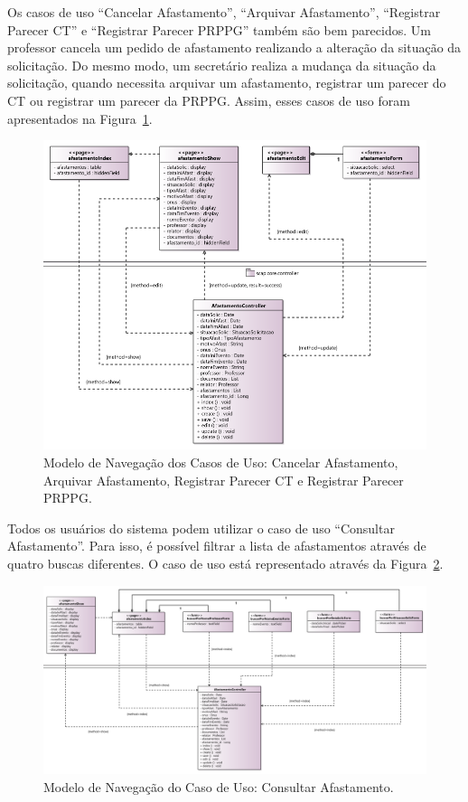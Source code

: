 Os casos de uso ``Cancelar Afastamento'', ``Arquivar Afastamento'', ``Registrar Parecer CT'' e ``Registrar Parecer PRPPG'' também são bem parecidos. Um professor cancela um pedido de afastamento realizando a alteração da situação da solicitação. Do mesmo modo, um secretário realiza a mudança da situação da solicitação, quando necessita arquivar um afastamento, registrar um parecer do CT ou registrar um parecer da PRPPG. Assim, esses casos de uso foram apresentados na Figura~\ref{figura-arquitetura-cancelar_arquivar_CT_PRPPG}.   

\begin{figure}[h]
	\centering
	\includegraphics[width=1\textwidth]{figuras/figura-arquitetura-cancelar_arquivar_CT_PRPPG.png}
	\caption{Modelo de Navegação dos Casos de Uso: Cancelar Afastamento, Arquivar Afastamento, Registrar Parecer CT e Registrar Parecer PRPPG.}
	\label{figura-arquitetura-cancelar_arquivar_CT_PRPPG}
\end{figure}

Todos os usuários do sistema podem utilizar o caso de uso ``Consultar Afastamento''. Para isso, é possível filtrar a lista de afastamentos através de quatro buscas diferentes. O caso de uso está representado através da Figura~\ref{figura-arquitetura-consultarAfastamento}.

\begin{figure}[h]
	\centering
	\includegraphics[width=1\textwidth]{figuras/figura-arquitetura-consultarAfastamento.png}
	\caption{Modelo de Navegação do Caso de Uso: Consultar Afastamento.}
	\label{figura-arquitetura-consultarAfastamento}
\end{figure}


